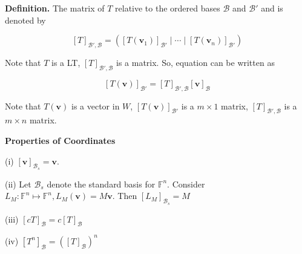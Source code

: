 \documentclass[10pt,landscape]{article}
\begin{document}
\begin{multicols}{4}
\textbf{Definition.} The matrix of $T$ relative to the ordered bases $\mathcal{B}$ and $\mathcal{B'}$ and is denoted by

$$
[T]_{\mathcal{B'}, \mathcal{B}} = ( [T(\mathbf{v}_1)]_{\mathcal{B'}} \mid \cdots \mid [T(\mathbf{v}_n)]_{\mathcal{B'}} )
$$

Note that $T$ is a LT, $[T]_{\mathcal{B'}, \mathcal{B}}$ is a matrix. So, equation can be written as

$$
[T(\mathbf{v})]_{\mathcal{B'}} = [T]_{\mathcal{B'}, \mathcal{B}}[\mathbf{v}]_{\mathcal{B}}
$$

Note that $T(\mathbf{v})$ is a vector in $W$, $[T(\mathbf{v})]_{\mathcal{B'}}$ is a $m \times 1$ matrix, $[T]_{\mathcal{B'}, \mathcal{B}}$ is a $m \times n$ matrix.

\textbf{Properties of Coordinates}

(i) $[\mathbf{v}]_{\mathcal{B}_s} = \mathbf{v}$.

(ii) Let $\mathcal{B}_s$ denote the standard basis for $\mathbb{F}^n$. Consider $L_M: \mathbb{F}^n \mapsto \mathbb{F}^n, L_M(\mathbf{v}) = M\mathbf{v}$. Then $[L_M]_{\mathcal{B}_s} = M$

(iii) $[cT]_{\mathcal{B}} = c[T]_{\mathcal{B}}$

(iv) $[T^n]_{\mathcal{B}} = ([T]_{\mathcal{B}})^n$












\end{multicols}
\end{document}
